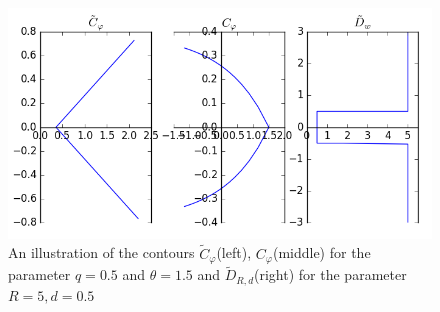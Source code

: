 \begin{figure}
	\centering
	\includegraphics[width=\textwidth]{contour-cphi}
	\caption[The contours $\tilde{C}_{\varphi}$(left), $C_{\varphi}$(right) and $\tilde{D}_{w}$]
	{An illustration of the contours $\tilde{C}_{\varphi}$(left), $C_{\varphi}$(middle) for the parameter $q = 0.5$ and $\theta = 1.5$ and $\tilde{D}_{R,d}$(right) for the parameter $R = 5, d = 0.5$}
	\label{fig:cphi-contour}
\end{figure}

